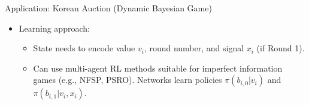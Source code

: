 \documentclass[10pt]{beamer}
\begin{document}
\begin{frame}{Application: Korean Auction (Dynamic Bayesian Game)}
\begin{itemize}
        \item Learning approach:
        \begin{itemize}
            \item State needs to encode value $v_i$, round number, and signal $x_i$ (if Round 1).
            \item Can use multi-agent RL methods suitable for imperfect information games (e.g., NFSP, PSRO). Networks learn policies $\pi(b_{i,0}|v_i)$ and $\pi(b_{i,1}|v_i, x_i)$.
        \end{itemize}
    \end{itemize}
\end{frame}

\end{document}

